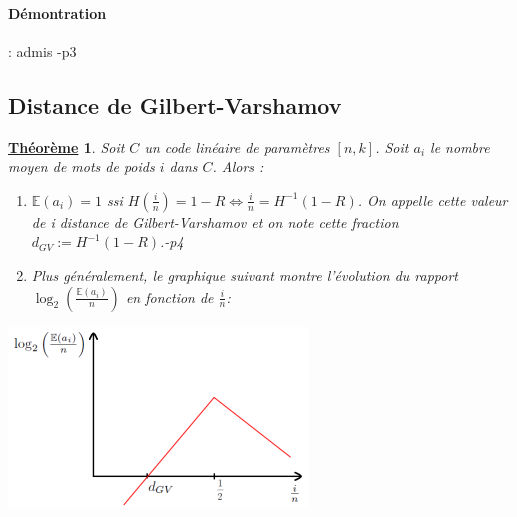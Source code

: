 \documentclass[12pt,openany]{report}
\newtheorem{theorem}{\underline{Théorème}}
\begin{document}
\paragraph{Démontration}: admis \cite{Ghazal}-p3
\subsection{Distance de Gilbert-Varshamov}


\begin{theorem}
Soit $\mathit{C}$ un code linéaire de paramètres $[n, k]$. Soit $a_i$ le nombre moyen de mots de poids $i$ dans $\mathit{C}$. Alors :
\begin{enumerate}
\item $ \mathbb{E}(a_i)=1$ ssi $H(\frac{i}{n})=1-R \Leftrightarrow \frac{i}{n}=H^{-1}(1-R)$.\hspace{0.2cm} On appelle cette valeur
de i distance de Gilbert-Varshamov et on note cette fraction $d_{GV}:=H^{-1}(1-R)$.\cite{Ghazal}-p4
\item Plus généralement, le graphique suivant montre l’évolution du rapport $\log_2\left( \frac{\mathbb{E}(a_i)}{n} \right)$ en fonction de $\frac{i}{n}$:
\end{enumerate}
\end{theorem}
\begin{center}
\includegraphics[scale=1.2]{./graphesperance}
\end{center}
\end{document}
